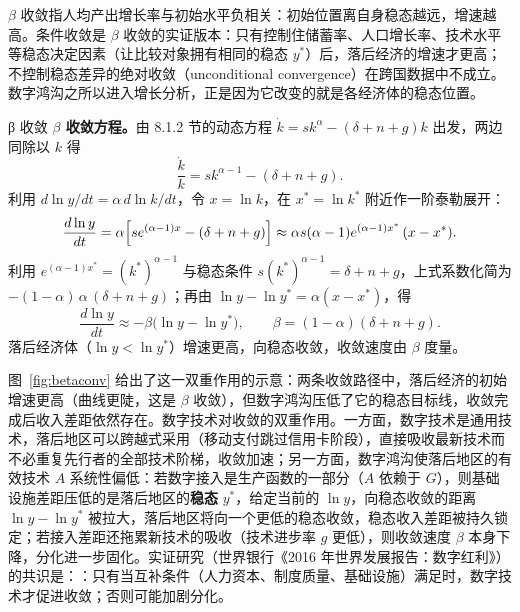 \begin{definition}
$\beta$ 收敛指人均产出增长率与初始水平负相关：初始位置离自身稳态越远，增速越高。条件收敛是 $\beta$ 收敛的实证版本：只有控制住储蓄率、人口增长率、技术水平等稳态决定因素（让比较对象拥有相同的稳态 $y^*$）后，落后经济的增速才更高；不控制稳态差异的绝对收敛（unconditional convergence）在跨国数据中不成立。数字鸿沟之所以进入增长分析，正是因为它改变的就是各经济体的稳态位置。
\end{definition}

\begin{derivation}{β 收敛}{}
\textbf{$\beta$ 收敛方程。}由 8.1.2 节的动态方程 $\dot k = s k^\alpha - (\delta+n+g)k$ 出发，两边同除以 $k$ 得
\[
\frac{\dot k}{k} = s k^{\alpha-1} - (\delta+n+g).
\]
利用 $d\ln y/dt = \alpha\, d\ln k/dt$，令 $x = \ln k$，在 $x^* = \ln k^*$ 附近作一阶泰勒展开：
\[
\frac{d\ln y}{dt} = \alpha\Bigl[s e^{(\alpha-1)x} - (\delta+n+g)\Bigr] \approx \alpha s (\alpha-1) e^{(\alpha-1)x^*}\,(x - x^*).
\]
利用 $e^{(\alpha-1)x^*} = (k^*)^{\alpha-1}$ 与稳态条件 $s (k^*)^{\alpha-1} = \delta+n+g$，上式系数化简为 $-(1-\alpha)\,\alpha\,(\delta+n+g)$；再由 $\ln y - \ln y^* = \alpha(x - x^*)$，得
\[
\frac{d\ln y}{dt} \approx -\beta\bigl(\ln y - \ln y^*\bigr), \qquad \beta = (1-\alpha)(\delta + n + g).
\]
落后经济体（$\ln y < \ln y^*$）增速更高，向稳态收敛，收敛速度由 $\beta$ 度量。
\end{derivation}

图~\ref{fig:betaconv} 给出了这一双重作用的示意：两条收敛路径中，落后经济的初始增速更高（曲线更陡，这是 $\beta$ 收敛），但数字鸿沟压低了它的稳态目标线，收敛完成后收入差距依然存在。数字技术对收敛的双重作用。一方面，数字技术是通用技术，落后地区可以跨越式采用（移动支付跳过信用卡阶段），直接吸收最新技术而不必重复先行者的全部技术阶梯，收敛加速；另一方面，数字鸿沟使落后地区的有效技术 $A$ 系统性偏低：若数字接入是生产函数的一部分（$A$ 依赖于 $G$），则基础设施差距压低的是落后地区的\textbf{稳态} $y^*$，给定当前的 $\ln y$，向稳态收敛的距离 $\ln y - \ln y^*$ 被拉大，落后地区将向一个更低的稳态收敛，稳态收入差距被持久锁定；若接入差距还拖累新技术的吸收（技术进步率 $g$ 更低），则收敛速度 $\beta$ 本身下降，分化进一步固化。实证研究（世界银行《2016 年世界发展报告：数字红利》）的共识是：：只有当互补条件（人力资本、制度质量、基础设施）满足时，数字技术才促进收敛；否则可能加剧分化。

